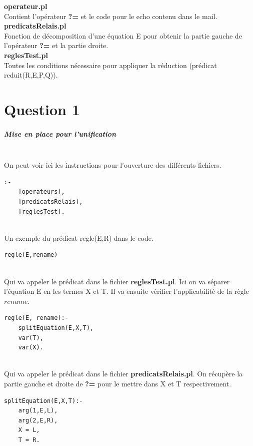 \documentclass[10pt,a4paper]{report}
\begin{document}
\begin{center}
\textbf{operateur.pl}\\
Contient l'opérateur \textbf{?=} et le code pour le echo contenu dans le mail.\\[1cm]
\textbf{predicatsRelais.pl}\\
Fonction de décomposition d'une équation E pour obtenir la partie gauche de
l'opérateur \textbf{?=} et la partie droite.\\[1cm]
\textbf{reglesTest.pl}\\
Toutes les conditions nécessaire pour appliquer la réduction (prédicat reduit(R,E,P,Q)).\\[1cm]
\end{center}





\chapter*{Question 1}
\paragraph{Mise en place pour l'unification} ~\\
On peut voir ici les instructions pour l'ouverture des différents fichiers.
\begin{lstlisting}[caption ={Ouverture des fichiers dans $main.pl$}]
:-
	[operateurs],
	[predicatsRelais],
	[reglesTest].
\end{lstlisting} ~\\
Un exemple du prédicat regle(E,R) dans le code.
\begin{lstlisting}[caption ={regle dans le fichier $main.pl$}]
regle(E,rename)
\end{lstlisting} ~\\
Qui va appeler le prédicat dans le fichier \textbf{reglesTest.pl}. Ici on va séparer l'équation E en les termes X et T. Il va ensuite vérifier l'applicabilité de la règle $rename$.
\begin{lstlisting}[caption ={regle dans le fichier $reglesTest.pl$}]
regle(E, rename):-
	splitEquation(E,X,T),
	var(T),
	var(X).
\end{lstlisting} ~\\
Qui va appeler le prédicat dans le fichier \textbf{predicatsRelais.pl}. On récupère la partie gauche et droite de \textbf{?=} pour le mettre dans X et T respectivement.
\begin{lstlisting}[caption ={splitEquation dans le fichier $predicatsRelais.pl$}]
splitEquation(E,X,T):-
	arg(1,E,L),
	arg(2,E,R),
	X = L,
	T = R.
\end{lstlisting}
\end{document}
